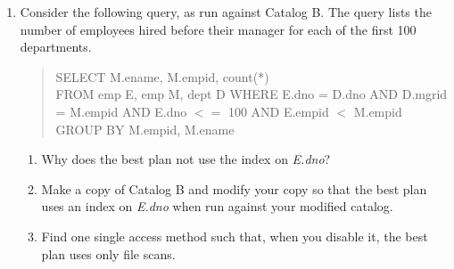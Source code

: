 \begin{enumerate}
\item

Consider the following query, as run against Catalog B.  The query lists the
number of employees hired before their manager for each of the first 100 departments.
\begin{quote}
	SELECT M.ename, M.empid, count(*)\\
	FROM emp E, emp M, dept D
	WHERE E.dno = D.dno AND D.mgrid = M.empid
		AND E.dno $<=$ 100 AND E.empid $<$ M.empid
	GROUP BY M.empid, M.ename
\end{quote}
\begin{enumerate}
\item
Why does the best plan not use the index on {\em E.dno}?
\item
Make a copy of Catalog B and modify your copy so that the best plan
uses an index on {\em E.dno} when run against your modified catalog.
\item
Find one single access method such that, when you disable it, the best
plan uses only file scans.
\end{enumerate}

\end{enumerate}
